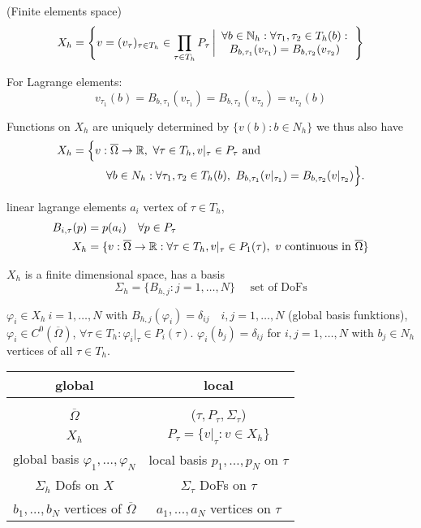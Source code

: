 \begin{definition_}
	(Finite elements space)
	\begin{equation*}
		X_h = \left \{ v = (v_\tau)_{\tau \in T_h} \in \prod \limits_{\tau \in T_h} P_\tau \left|
\begin{array}{c}
\forall b  \in\mathbb{N}_h : \forall \tau_1,\tau_2 \in T_h(b):\\
B_{b,\tau_1}(v_{\tau_1}) = B_{b,\tau_2}(v_{\tau_2}) 
\end{array}		
 \right.\right \}
	\end{equation*}
\end{definition_}
For Lagrange elements:
\begin{equation*}
	v_{\tau_1}(b) = B_{b,\tau_1}(v_{\tau_1}) = B_{b,\tau_2}(v_{\tau_2}) = v_{\tau_2}(b)
\end{equation*}

Functions on $X_h$ are uniquely determined by $\{v(b): b \in N_h \}$ we thus also have 
\begin{align*}
	X_h = \Big \{& v: \overline{\Omega} \to \mathbb{R},\ \forall \tau \in T_h, v|_\tau \in P_\tau \text{ and }\\ &{} \quad \forall b \in N_h: \forall \tau_1,\tau_2 \in T_h(b) ,\ B_{b,\tau_1}(v|_{\tau_1}) = B_{b,\tau_2}(v|_{\tau_2})  \Big\}.
\end{align*}

\begin{example}
	linear lagrange elements $a_i$ vertex of $\tau \in T_h$,
	\begin{align*}
		B_{i,\tau}(p)  &= p(a_i) \quad \forall p \in P_\tau \\
		X_h &= \{ v:\overline{\Omega} \to \mathbb{R} : \forall \tau \in T_h, v|_{\tau} \in P_1(\tau) ,\ v \text{ continuous in } \overline{\Omega} \}
	\end{align*}
\end{example}

$X_h$ is a finite dimensional space, has a basis
\begin{equation*}
	\Sigma_h = \{ B_{h,j} : j= 1,\dots,N  \} \quad \text{ set of DoFs} 
\end{equation*}

$\varphi_i \in X_h\ i=1,\dots,N$ with $B_{h,j}(\varphi_i) = \delta_{ij} \quad i,j=1,\dots,N$ (global basis funktions),$\varphi_i \in C^0(\overline{\Omega})$, $\forall \tau \in T_h: \varphi_i|_\tau \in P_i(\tau)$. $\varphi_i(b_j) = \delta_{ij}$ for $i,j = 1,\dots,N$ with $b_j \in N_h$ vertices of all $\tau \in T_h$.\nl
\centering
\begin{tabular}{c|c}
	global  & local \\ \hline 
	&\\
	$\overline{\Omega} $&  ($\tau , P_\tau, \Sigma_\tau$) \\
	$X_h$ & $P_\tau = \{ v|_\tau :v \in X_h  \}$ \\
	global basis $\varphi_1,\dots,\varphi_N$ & local basis $p_1,\dots,p_N$ on $\tau$\\
	$\Sigma_h$ Dofs on $X$ & $\Sigma_\tau$ DoFs on $\tau$\\
	$b_1,\dots,b_N$ vertices of $\overline{\Omega}$ & $a_1,\dots,a_N$ vertices on $\tau$		
\end{tabular}

